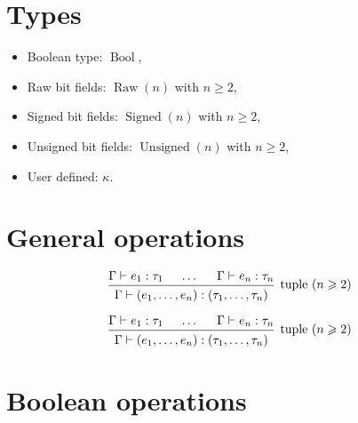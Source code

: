 \documentclass[english, 12pt]{article}
\DeclareMathOperator{\Si}{Signed}
\DeclareMathOperator{\Un}{Unsigned}
\DeclareMathOperator{\Ra}{Raw}
\DeclareMathOperator{\Bool}{Bool}
\begin{document}
\section{Types}
\begin{itemize}
    \item Boolean type: $\Bool$,
    \item Raw bit fields: $\Ra(n)$ with $n \geqslant 2$,
    \item Signed bit fields: $\Si(n)$ with $n \geqslant 2$,
    \item Unsigned bit fields: $\Un(n)$ with $n \geqslant 2$,
    \item User defined: $\kappa$.
\end{itemize}

\section{General operations}

\[
    \begin{prooftree}
        \hypo{\Gamma \vdash e_1 : \tau_1}
        \hypo{\dots}
        \hypo{\Gamma \vdash e_n : \tau_n}
        \infer3[tuple $(n\geqslant2)$]{\Gamma \vdash (e_1, \dots, e_n) : (\tau_1, \dots, \tau_n)}
    \end{prooftree}
\]

\[
    \begin{prooftree}
        \hypo{\Gamma \vdash e_1 : \tau_1}
        \hypo{\dots}
        \hypo{\Gamma \vdash e_n : \tau_n}
        \infer3[tuple $(n\geqslant2)$]{\Gamma \vdash (e_1, \dots, e_n) : (\tau_1, \dots, \tau_n)}
    \end{prooftree}
\]


\section{Boolean operations}
\end{document}
